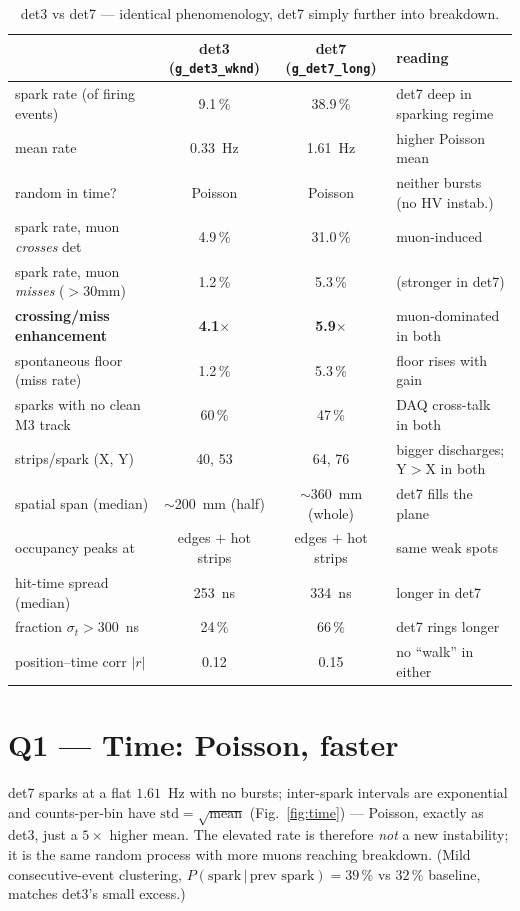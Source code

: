 \documentclass[11pt]{article}
\begin{document}
\begin{table}[h]\centering\small
\begin{tabular}{lccl}
\toprule
 & \textbf{det3} (\texttt{g\_det3\_wknd}) & \textbf{det7} (\texttt{g\_det7\_long}) & reading\\
\midrule
spark rate (of firing events) & 9.1\,\% & 38.9\,\% & det7 deep in sparking regime\\
mean rate & 0.33~Hz & 1.61~Hz & higher Poisson mean\\
random in time? & Poisson & Poisson & neither bursts (no HV instab.)\\[2pt]
spark rate, muon \emph{crosses} det & 4.9\,\% & 31.0\,\% & muon-induced\\
spark rate, muon \emph{misses} ($>$30mm) & 1.2\,\% & 5.3\,\% & (stronger in det7)\\
\textbf{crossing/miss enhancement} & \textbf{4.1$\times$} & \textbf{5.9$\times$} & muon-dominated in both\\
spontaneous floor (miss rate) & 1.2\,\% & 5.3\,\% & floor rises with gain\\
sparks with no clean M3 track & 60\,\% & 47\,\% & DAQ cross-talk in both\\[2pt]
strips/spark (X, Y) & 40, 53 & 64, 76 & bigger discharges; Y$>$X in both\\
spatial span (median) & $\sim$200~mm (half) & $\sim$360~mm (whole) & det7 fills the plane\\
occupancy peaks at & edges $+$ hot strips & edges $+$ hot strips & same weak spots\\[2pt]
hit-time spread (median) & 253~ns & 334~ns & longer in det7\\
fraction $\sigma_t>300$~ns & 24\,\% & 66\,\% & det7 rings longer\\
position--time corr $|r|$ & 0.12 & 0.15 & no ``walk'' in either\\
\bottomrule
\end{tabular}
\caption{det3 vs det7 --- identical phenomenology, det7 simply further into breakdown.}
\label{tab:cmp}
\end{table}

\section{Q1 --- Time: Poisson, faster}
det7 sparks at a flat $1.61$~Hz with no bursts; inter-spark intervals are exponential and
counts-per-bin have $\mathrm{std}=\sqrt{\mathrm{mean}}$ (Fig.~\ref{fig:time}) --- Poisson,
exactly as det3, just a $5\times$ higher mean. The elevated rate is therefore \emph{not} a
new instability; it is the same random process with more muons reaching breakdown. (Mild
consecutive-event clustering, $P(\text{spark}\,|\,\text{prev spark})=39\,\%$ vs $32\,\%$
baseline, matches det3's small excess.)
\end{document}
